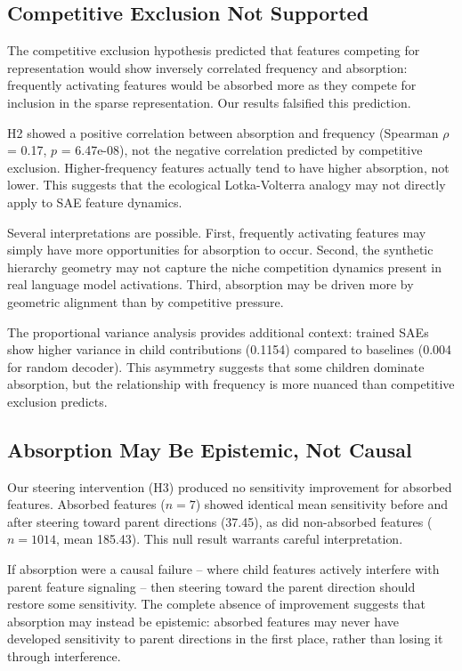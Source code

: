 \documentclass{article}
\begin{document}
\subsection{Competitive Exclusion Not Supported}

The competitive exclusion hypothesis predicted that features competing for representation would show inversely correlated frequency and absorption: frequently activating features would be absorbed more as they compete for inclusion in the sparse representation. Our results falsified this prediction.

H2 showed a positive correlation between absorption and frequency (Spearman $\rho$ = 0.17, $p$ = 6.47e-08), not the negative correlation predicted by competitive exclusion. Higher-frequency features actually tend to have higher absorption, not lower. This suggests that the ecological Lotka-Volterra analogy may not directly apply to SAE feature dynamics.

Several interpretations are possible. First, frequently activating features may simply have more opportunities for absorption to occur. Second, the synthetic hierarchy geometry may not capture the niche competition dynamics present in real language model activations. Third, absorption may be driven more by geometric alignment than by competitive pressure.

The proportional variance analysis provides additional context: trained SAEs show higher variance in child contributions (0.1154) compared to baselines (0.004 for random decoder). This asymmetry suggests that some children dominate absorption, but the relationship with frequency is more nuanced than competitive exclusion predicts.

\subsection{Absorption May Be Epistemic, Not Causal}

Our steering intervention (H3) produced no sensitivity improvement for absorbed features. Absorbed features ($n=7$) showed identical mean sensitivity before and after steering toward parent directions (37.45), as did non-absorbed features ($n=1014$, mean 185.43). This null result warrants careful interpretation.

If absorption were a causal failure -- where child features actively interfere with parent feature signaling -- then steering toward the parent direction should restore some sensitivity. The complete absence of improvement suggests that absorption may instead be epistemic: absorbed features may never have developed sensitivity to parent directions in the first place, rather than losing it through interference.
\end{document}
